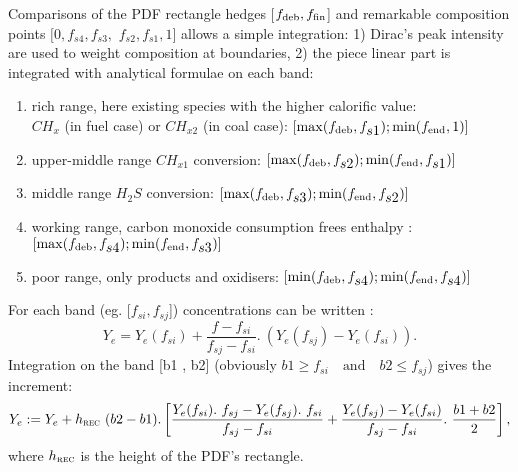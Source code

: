 Comparisons of the PDF rectangle hedges [$f_{\mbox{\scriptsize deb}} ,
f_{\mbox{\scriptsize fin}}$] and remarkable composition points $[0,
f_{\displaystyle s4}, f_{\displaystyle s3},$ $f_{\displaystyle s2},
f_{\displaystyle s1}, 1]$ allows a simple integration: 1) Dirac's peak
intensity are used to weight composition at boundaries, 2) the piece linear part
is integrated with analytical formulae on each band:
 
\begin{enumerate}
\item rich range, here existing species with the higher calorific value: \\
  \hspace{0.25cm}$CH_{x}$ (in fuel case) or $CH_{x2}$ (in coal case):
  $[\max(f_{\mbox{\scriptsize deb}},f_{\displaystyle s1}) ;
  \min(f_{\mbox{\scriptsize end}},1)]$
\item upper-middle range $CH_{x1}$ conversion: $[\max(f_{\mbox{\scriptsize
      deb}},f_{\displaystyle s2} ); \min (f_{\mbox{\scriptsize
      end}},f_{\displaystyle s1})]$
\item middle range $H_{2}S$ conversion: $[\max(f_{\mbox{\scriptsize
      deb}},f_{\displaystyle s3} ); \min (f_{\mbox{\scriptsize
      end}},f_{\displaystyle s2})]$
\item working range, carbon monoxide consumption frees enthalpy :
  $[\max(f_{\mbox{\scriptsize deb}},f_{\displaystyle s4} ); \min
  (f_{\mbox{\scriptsize end}},f_{\displaystyle s3})]$
\item poor range, only products and oxidisers: $[\min(f_{\mbox{\scriptsize
      deb}},f_{\displaystyle s4} ); \min (f_{\mbox{\scriptsize
      end}},f_{\displaystyle s4})]$
\end{enumerate}
For each band (eg. [$f_{\displaystyle si} , f_{\displaystyle sj}$])
concentrations can be written :
\begin{equation*}
  Y_e = Y_{e}(f_{si}) + \dfrac{f-f_{si}}{f_{sj}-f_{si}} .~ \left( Y_{e}(f_{sj})-Y_{e}(f_{si}) \right).
\end{equation*}
Integration on the band [b1 , b2] (obviously $b1 \geq f_{si} \quad \text{and}
\quad b2 \leq f_{sj}$) gives the increment:
\begin{equation*}
  Y_{e} :=  Y_e + h_{\mbox{\scriptsize \textsc{rec}}}~(b2-b1)  .  \left[ \dfrac{Y_{e}(f_{si}).~f_{sj}-Y_{e}(f_{sj}).~f_{si}}{f_{sj}-f_{si}}
   +         \dfrac{Y_{e}(f_{sj})-Y_{e}(f_{si})}{f_{sj}-f_{si}}.~\dfrac{b1+b2}{2} \right],
\end{equation*}
where $h_{\mbox{\scriptsize \textsc{rec}}}$ is the height of the PDF's
rectangle.

